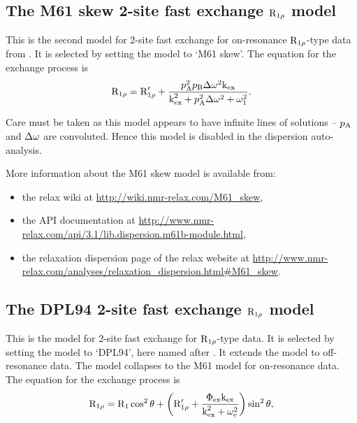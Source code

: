 
\subsection{The M61 skew 2-site fast exchange $\mathrm{R}_{1\rho}$ model}
\label{sect: dispersion: M61 skew model}

This is the second model for 2-site fast exchange for on-resonance $\mathrm{R}_{1\rho}$-type data from \citet{Meiboom61}.
It is selected by setting the model to `M61 skew'.
The equation for the exchange process is
\begin{equation}
    \mathrm{R}_{1\rho} = \mathrm{R}_{1\rho}' + \frac{p_\textrm{A}^2p_\textrm{B}\Delta\omega^2\textrm{k}_\textrm{ex}}{\textrm{k}_\textrm{ex}^2 + p_\textrm{A}^2\Delta\omega^2 + \omega_1^2}.
\end{equation}

Care must be taken as this model appears to have infinite lines of solutions -- $p_\textrm{A}$ and $\Delta\omega$ are convoluted.
Hence this model is disabled in the dispersion auto-analysis.

More information about the M61 skew model is available from:
\begin{itemize}
  \item the relax wiki at \url{http://wiki.nmr-relax.com/M61\_skew},
  \item the API documentation at \url{http://www.nmr-relax.com/api/3.1/lib.dispersion.m61b-module.html},
  \item the relaxation dispersion page of the relax website at \url{http://www.nmr-relax.com/analyses/relaxation\_dispersion.html#M61\_skew}.
\end{itemize}



\subsection{The DPL94 2-site fast exchange $\mathrm{R}_{1\rho}$ model}
\label{sect: dispersion: DPL94 model}

This is the model for 2-site fast exchange for $\mathrm{R}_{1\rho}$-type data.
It is selected by setting the model to `DPL94', here named after \citet{Davis94}.
It extends the \citet{Meiboom61} model to off-resonance data.
The model collapses to the M61 model for on-resonance data.
The equation for the exchange process is
\begin{equation}
    \mathrm{R}_{1\rho} = \mathrm{R}_1 \cos^2\theta  +  \left( \mathrm{R}_{1\rho}' + \frac{\Phi_\textrm{ex}\textrm{k}_\textrm{ex}}{\textrm{k}_\textrm{ex}^2 + \omega_\textrm{e}^2} \right) \sin^2\theta,
\end{equation}

